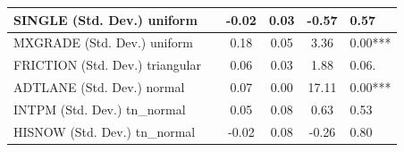 \begin{table}
\begin{center}
\begin{tabular}{|l|l|c|c|c|l|}
			\hline
			SINGLE (Std. Dev.) uniform &  & -0.02 & 0.03 & -0.57 & 0.57 \\
			\hline
			MXGRADE (Std. Dev.) uniform &  & 0.18 & 0.05 & 3.36 & 0.00*** \\
			\hline
			FRICTION (Std. Dev.) triangular &  & 0.06 & 0.03 & 1.88 & 0.06. \\
			\hline
			ADTLANE (Std. Dev.) normal &  & 0.07 & 0.00 & 17.11 & 0.00*** \\
			\hline
			INTPM (Std. Dev.) tn_normal &  & 0.05 & 0.08 & 0.63 & 0.53 \\
			\hline
			HISNOW (Std. Dev.) tn_normal &  & -0.02 & 0.08 & -0.26 & 0.80 \\
			\hline
		\end{tabular}
	\end{center}
\end{table}